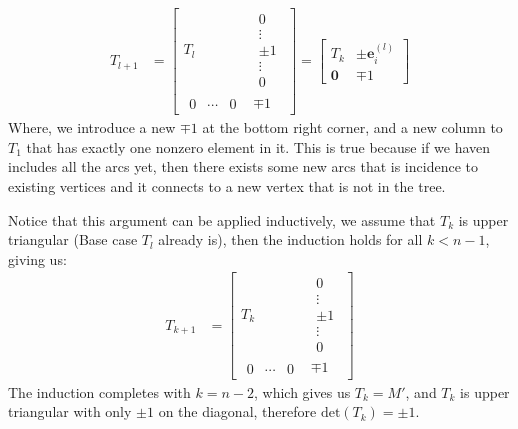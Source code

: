 \documentclass[]{article}
\theoremstyle{definition}
\begin{document}
        \begin{align}
            T_{l + 1} &= 
            \begin{bmatrix}
                T_l &  
                \begin{matrix}
                    0 \\ \vdots \\ \pm 1 \\ \vdots \\ 0
                \end{matrix}
                \\
                \begin{matrix}
                    0 & \cdots & 0
                \end{matrix} & \mp 1
            \end{bmatrix}
            =
            \begin{bmatrix}
                T_k & \pm \mathbf e_{i}^{(l)}
                \\
                \mathbf 0 & \mp 1
            \end{bmatrix}
        \end{align}
        Where, we introduce a new $\mp 1$ at the bottom right corner, and a new column to $T_1$ that has exactly one nonzero element in it. This is true because if we haven includes all the arcs yet, then there exists some new arcs that is incidence to existing vertices and it connects to a new vertex that is not in the tree. 
        \par
        Notice that this argument can be applied inductively, we assume that $T_k$ is upper triangular (Base case $T_l$ already is), then the induction holds for all $k< n - 1$, giving us: 
        \begin{align}
            T_{k + 1} &= 
            \begin{bmatrix}
                T_k &  
                \begin{matrix}
                    0 \\ \vdots \\ \pm 1 \\ \vdots \\ 0
                \end{matrix}
                \\
                \begin{matrix}
                    0 & \cdots & 0
                \end{matrix} & \mp 1
            \end{bmatrix}
        \end{align}
        The induction completes with $k = n - 2$, which gives us $T_k = M'$, and $T_k$ is upper triangular with only $\pm 1$ on the diagonal, therefore $\text{det}(T_k) = \pm 1$.
\end{document}
